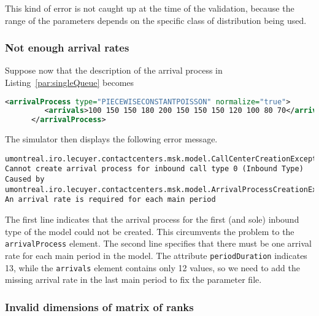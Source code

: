 This kind of error is not caught up at the time of the validation,
because the range of the parameters depends on the specific class of
distribution being used.

\subsubsection{Not enough arrival rates}

Suppose now that the description of the arrival process in
Listing~\ref{par:singleQueue} becomes
\begin{lstlisting}[language=XML]
      <arrivalProcess type="PIECEWISECONSTANTPOISSON" normalize="true">
         <arrivals>100 150 150 180 200 150 150 150 120 100 80 70</arrivals>
      </arrivalProcess>
\end{lstlisting}
The simulator then displays the following error message.
\begin{lstlisting}[language={},breaklines,prebreak={\char92}]
umontreal.iro.lecuyer.contactcenters.msk.model.CallCenterCreationException: Cannot create arrival process for inbound call type 0 (Inbound Type)
Caused by umontreal.iro.lecuyer.contactcenters.msk.model.ArrivalProcessCreationException: An arrival rate is required for each main period
\end{lstlisting}
The first line indicates that the arrival process for the first (and
sole) inbound type of the model could not be created.
This circumvents the problem to the \texttt{arrival\-Process}
element.
The second line specifies that there must be one arrival rate for each
main period in the model.
The attribute \texttt{period\-Duration} indicates 13, while the
\texttt{arrivals} element contains only 12 values, so we need to add
the missing arrival rate in the last main period to fix the parameter file.

\subsubsection{Invalid dimensions of matrix of ranks}

